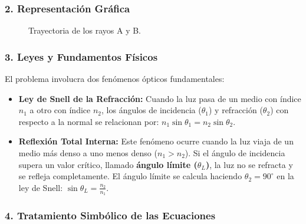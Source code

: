 \subsubsection*{2. Representación Gráfica}
\begin{figure}[H]
    \centering
    \caption{Trayectoria de los rayos A y B.}
\end{figure}

\subsubsection*{3. Leyes y Fundamentos Físicos}
El problema involucra dos fenómenos ópticos fundamentales:
\begin{itemize}
    \item \textbf{Ley de Snell de la Refracción:} Cuando la luz pasa de un medio con índice $n_1$ a otro con índice $n_2$, los ángulos de incidencia ($\theta_1$) y refracción ($\theta_2$) con respecto a la normal se relacionan por: $n_1 \sin\theta_1 = n_2 \sin\theta_2$.
    \item \textbf{Reflexión Total Interna:} Este fenómeno ocurre cuando la luz viaja de un medio más denso a uno menos denso ($n_1 > n_2$). Si el ángulo de incidencia supera un valor crítico, llamado \textbf{ángulo límite ($\theta_L$)}, la luz no se refracta y se refleja completamente. El ángulo límite se calcula haciendo $\theta_2=90^\circ$ en la ley de Snell: $\sin\theta_L = \frac{n_2}{n_1}$.
\end{itemize}

\subsubsection*{4. Tratamiento Simbólico de las Ecuaciones}
